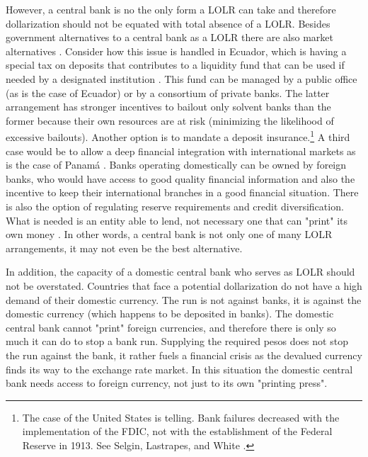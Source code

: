 \documentclass[12pt]{article}
\begin{document}
However, a central bank is no the only form a LOLR can take and therefore dollarization should not be equated with total absence of a LOLR. Besides government alternatives to a central bank as a LOLR there are also market alternatives \parencite[][pp. 14-15]{Jacome2010}. Consider how this issue is handled in Ecuador, which is having a special tax on deposits that contributes to a liquidity fund that can be used if needed by a designated institution \parencite{Quispe-Agnoli2006}. This fund can be managed by a public office (as is the case of Ecuador) or by a consortium of private banks. The latter arrangement has stronger incentives to bailout only solvent banks than the former because their own resources are at risk (minimizing the likelihood of excessive bailouts). Another option is to mandate a deposit insurance.\footnote{The case of the United States is telling. Bank failures decreased with the implementation of the FDIC, not with the establishment of the Federal Reserve in 1913. See Selgin, Lastrapes, and White \parencite*[][pp. 582-583]{Selgin2012a}.} A third case would be to allow a deep financial integration with international markets as is the case of Panamá \parencite{MorenoVillalaz1999,MorenoVillalaz2005}. Banks operating domestically can be owned by foreign banks, who would have access to good quality financial information and also the incentive to keep their international branches in a good financial situation. There is also the option of regulating reserve requirements and credit diversification.  What is needed is an entity able to lend, not necessary one that can "print" its own money \parencite{Calvo2001}. In other words, a central bank is not only one of many LOLR arrangements, it may not even be the best alternative.

In addition, the capacity of a domestic central bank who serves as LOLR should not be overstated. Countries that face a potential dollarization do not have a high demand of their domestic currency. The run is not against banks, it is against the domestic currency (which happens to be deposited in banks). The domestic central bank cannot "print" foreign currencies, and therefore there is only so much it can do to stop a bank run. Supplying the required pesos does not stop the run against the bank, it rather fuels a financial crisis as the devalued currency finds its way to the exchange rate market. In this situation the domestic central bank needs access to foreign currency, not just to its own "printing press".
\end{document}
